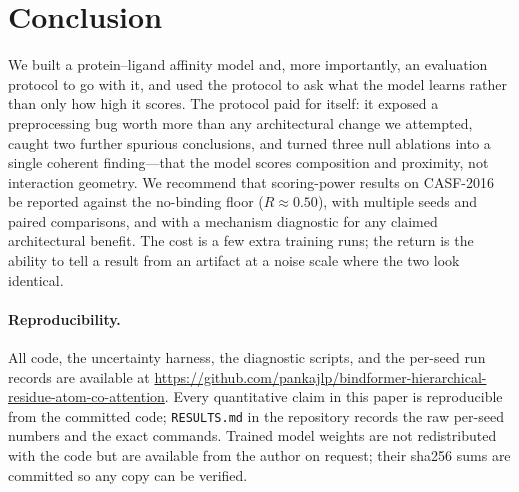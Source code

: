 \documentclass[11pt]{article}
\newcommand{\code}[1]{\texttt{#1}}
\begin{document}
\section{Conclusion}

We built a protein--ligand affinity model and, more importantly, an evaluation protocol to
go with it, and used the protocol to ask what the model learns rather than only how high it
scores. The protocol paid for itself: it exposed a preprocessing bug worth more than any
architectural change we attempted, caught two further spurious conclusions, and turned three
null ablations into a single coherent finding---that the model scores composition and
proximity, not interaction geometry. We recommend that scoring-power results on CASF-2016 be
reported against the no-binding floor ($R\approx0.50$), with multiple seeds and paired
comparisons, and with a mechanism diagnostic for any claimed architectural benefit. The
cost is a few extra training runs; the return is the ability to tell a result from an
artifact at a noise scale where the two look identical.

\paragraph{Reproducibility.} All code, the uncertainty harness, the diagnostic scripts, and
the per-seed run records are available at
\url{https://github.com/pankajlp/bindformer-hierarchical-residue-atom-co-attention}. Every
quantitative claim in this paper is reproducible from the committed code; \code{RESULTS.md}
in the repository records the raw per-seed numbers and the exact commands. Trained model weights are not redistributed with the code but are available from the author on request; their sha256 sums are committed so any copy can be verified.
\end{document}
